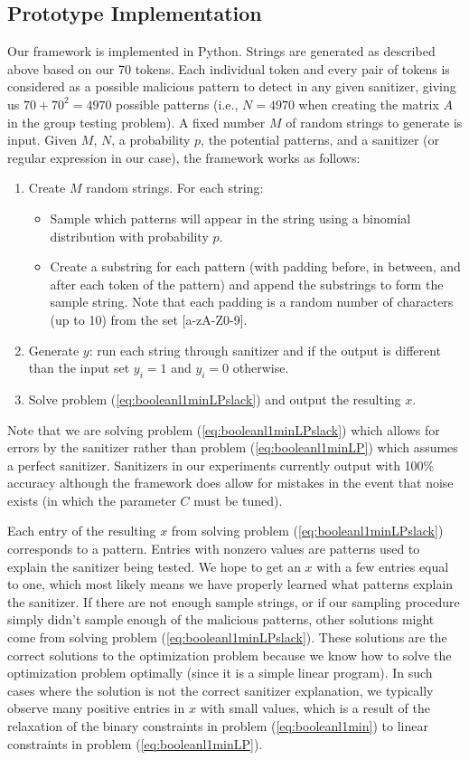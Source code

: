 \subsection{Prototype Implementation}
Our framework is implemented in Python. Strings are generated as described above based on our 70 tokens. Each individual token and every pair of tokens is considered as a possible malicious pattern to detect in any given sanitizer, giving us $70+70^2=4970$ possible patterns (i.e., $N=4970$ when creating the matrix $A$ in the group testing problem). A fixed number $M$ of random strings to generate is input. Given $M$, $N$, a probability $p$, the potential patterns, and a sanitizer (or regular expression in our case), the framework works as follows:
\begin{enumerate}
	\item Create $M$ random strings. For each string:
		\begin{itemize}
			\item Sample which patterns will appear in the string using a binomial distribution with probability $p$.
			\item Create a substring for each pattern (with padding before, in between, and after each token of the pattern) and append the substrings to form the sample string. Note that each padding is a random number of characters (up to 10) from the set [a-zA-Z0-9].
		\end{itemize}
	\item Generate $y$: run each string through sanitizer and if the output is different than the input set $y_i=1$ and $y_i=0$ otherwise.
	\item Solve problem (\ref{eq:booleanl1minLPslack}) and output the resulting $x$.
\end{enumerate}
Note that we are solving problem (\ref{eq:booleanl1minLPslack}) which allows for errors by the sanitizer rather than problem (\ref{eq:booleanl1minLP}) which assumes a perfect sanitizer. Sanitizers in our experiments currently output with 100\% accuracy although the framework does allow for mistakes in the event that noise exists (in which the parameter $C$ must be tuned).

Each entry of the resulting $x$ from solving problem (\ref{eq:booleanl1minLPslack}) corresponds to a pattern.  Entries with nonzero values are patterns used to explain the sanitizer being tested. We hope to get an $x$ with a few entries equal to one, which most likely means we have properly learned what patterns explain the sanitizer. If there are not enough sample strings, or if our sampling procedure simply didn't sample enough of the malicious patterns, other solutions might come from solving problem (\ref{eq:booleanl1minLPslack}). These solutions are the correct solutions to the optimization problem because we know how to solve the optimization problem optimally (since it is a simple linear program). In such cases where the solution is not the correct sanitizer explanation, we typically observe many positive entries in $x$ with small values, which is a result of the relaxation of the binary constraints in problem (\ref{eq:booleanl1min}) to linear constraints in problem (\ref{eq:booleanl1minLP}).


